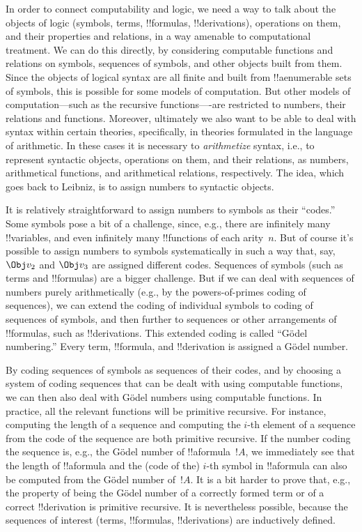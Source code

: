 \documentclass[../../../include/open-logic-section]{subfiles}
\begin{document}

In order to connect computability and logic, we need a way to talk
about the objects of logic (symbols, terms, !!{formula}s,
!!{derivation}s), operations on them, and their properties and
relations, in a way amenable to computational treatment.  We can do
this directly, by considering computable functions and relations on
symbols, sequences of symbols, and other objects built from them.
Since the objects of logical syntax are all finite and built from
!!a{enumerable} sets of symbols, this is possible for some models of
computation.  But other models of computation---such as the recursive
functions----are restricted to numbers, their relations and functions.
Moreover, ultimately we also want to be able to deal with syntax
within certain theories, specifically, in theories formulated in the
language of arithmetic.  In these cases it is necessary to
\emph{arithmetize} syntax, i.e., to represent syntactic objects,
operations on them, and their relations, as numbers, arithmetical
functions, and arithmetical relations, respectively. The idea, which
goes back to Leibniz, is to assign numbers to syntactic objects.

It is relatively straightforward to assign numbers to symbols as their
``codes.''  Some symbols pose a bit of a challenge, since, e.g., there
are infinitely many !!{variable}s, and even infinitely many
!!{function}s of each arity~$n$. But of course it's possible to assign
numbers to symbols systematically in such a way that, say, $\Obj v_2$
and $\Obj v_3$ are assigned different codes. Sequences of symbols
(such as terms and !!{formula}s) are a bigger challenge. But if we can
deal with sequences of numbers purely arithmetically (e.g., by the
powers-of-primes coding of sequences), we can extend the coding of
individual symbols to coding of sequences of symbols, and then further
to sequences or other arrangements of !!{formula}s, such as
!!{derivation}s. This extended coding is called ``G\"odel numbering.''
Every term, !!{formula}, and !!{derivation} is assigned a G\"odel
number.

By coding sequences of symbols as sequences of their codes, and by
choosing a system of coding sequences that can be dealt with using
computable functions, we can then also deal with G\"odel numbers using
computable functions.  In practice, all the relevant functions will be
primitive recursive.  For instance, computing the length of a sequence
and computing the $i$-th element of a sequence from the code of the
sequence are both primitive recursive. If the number coding the
sequence is, e.g., the G\"odel number of !!a{formula}~$!A$, we
immediately see that the length of !!a{formula} and the (code of the)
$i$-th symbol in !!a{formula} can also be computed from the G\"odel
number of~$!A$. It is a bit harder to prove that, e.g., the property
of being the G\"odel number of a correctly formed term or of a correct
!!{derivation} is primitive recursive.  It is nevertheless possible,
because the sequences of interest (terms, !!{formula}s,
!!{derivation}s) are inductively defined.
\end{document}
